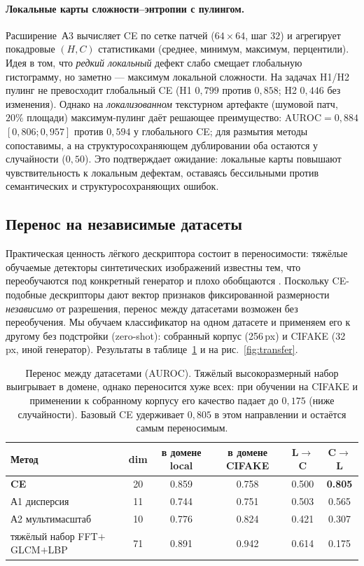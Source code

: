 \documentclass[14pt]{extarticle}
\theoremstyle{plain}
\numberwithin{equation}{section}
\numberwithin{figure}{section}
\numberwithin{table}{section}
\begin{document}
\paragraph{Локальные карты сложности–энтропии с пулингом.} Расширение~А3
вычисляет CE по сетке патчей ($64\times64$, шаг $32$) и агрегирует покадровые
$(H,C)$ статистиками (среднее, минимум, максимум, перцентили). Идея в том, что
\emph{редкий локальный} дефект слабо смещает глобальную гистограмму, но заметно —
максимум локальной сложности. На задачах H1/H2 пулинг не превосходит глобальный CE
(H1 $0{,}799$ против $0{,}858$; H2 $0{,}446$ без изменения). Однако на
\emph{локализованном} текстурном артефакте (шумовой патч, $20\%$ площади)
максимум-пулинг даёт решающее преимущество: $\mathrm{AUROC}=0{,}884$
$[0{,}806;0{,}957]$ против $0{,}594$ у глобального CE; для размытия методы
сопоставимы, а на структуросохраняющем дублировании оба остаются у случайности
($0{,}50$). Это подтверждает ожидание: локальные карты повышают чувствительность к
локальным дефектам, оставаясь бессильными против семантических и
структуросохраняющих ошибок.

\subsection{Перенос на независимые датасеты}\label{sec:transfer}
Практическая ценность лёгкого дескриптора состоит в переносимости: тяжёлые
обучаемые детекторы синтетических изображений известны тем, что переобучаются под
конкретный генератор и плохо обобщаются \citep{corvi2023detection}. Поскольку
CE-подобные дескрипторы дают вектор признаков фиксированной размерности
\emph{независимо} от разрешения, перенос между датасетами возможен без
переобучения. Мы обучаем классификатор на одном датасете и применяем его к другому
без подстройки (zero-shot): собранный корпус (256\,px) и CIFAKE (32\,px, иной
генератор). Результаты в таблице~\ref{tab:transfer} и на рис.~\ref{fig:transfer}.

\begin{table}[h!]
\centering
\caption{Перенос между датасетами (AUROC). Тяжёлый высокоразмерный набор
выигрывает в домене, однако переносится хуже всех: при обучении на CIFAKE и
применении к собранному корпусу его качество падает до $0{,}175$ (ниже
случайности). Базовый CE удерживает $0{,}805$ в этом направлении и остаётся самым
переносимым.}
\label{tab:transfer}
\begin{tabular}{@{}lccccc@{}}
\toprule
Метод & dim & в домене local & в домене CIFAKE & L$\to$C & C$\to$L \\
\midrule
\textbf{CE}                    & 20 & 0.859 & 0.758 & 0.500 & \textbf{0.805} \\
А1 дисперсия                   & 11 & 0.744 & 0.751 & 0.503 & 0.565 \\
А2 мультимасштаб               & 10 & 0.776 & 0.824 & 0.421 & 0.307 \\
тяжёлый набор FFT$+$GLCM$+$LBP  & 71 & 0.891 & 0.942 & 0.614 & 0.175 \\
\bottomrule
\end{tabular}

\end{table}
\end{document}
